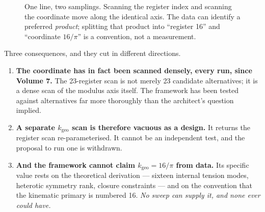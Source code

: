 \documentclass[11pt, letterpaper, openany]{book}
\newcommand{\kgeo}{k_{\mathrm{geo}}}
\begin{document}
\begin{figure}[H]
\centering
{}
\caption{One line, two samplings. Scanning the register index and scanning the coordinate move
along the identical axis. The data can identify a preferred \emph{product}; splitting that
product into ``register 16'' and ``coordinate $16/\pi$'' is a convention, not a measurement.}
\end{figure}

Three consequences, and they cut in different directions.

\begin{enumerate}
    \item \textbf{The coordinate has in fact been scanned densely, every run, since Volume 7.}
          The 23-register scan is not merely 23 candidate alternatives; it is a dense scan of the
          modulus axis itself. The framework has been tested against alternatives far more
          thoroughly than the architect's question implied.
    \item \textbf{A separate $\kgeo$ scan is therefore vacuous as a design.} It returns the
          register scan re-parameterised. It cannot be an independent test, and the proposal to
          run one is withdrawn.
    \item \textbf{And the framework cannot claim $\kgeo = 16/\pi$ from data.} Its specific value
          rests on the theoretical derivation --- sixteen internal tension modes, heterotic
          symmetry rank, closure constraints --- and on the convention that the kinematic
          primary is numbered 16. \emph{No sweep can supply it, and none ever could have.}
\end{enumerate}
\end{document}
